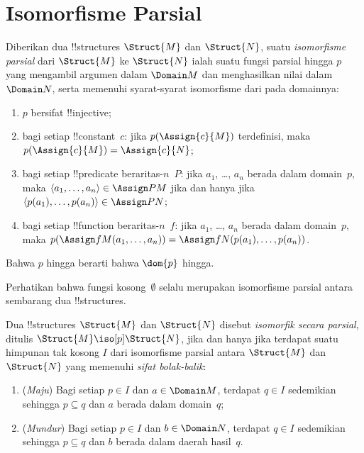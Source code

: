 \documentclass[../../../include/open-logic-section]{subfiles}
\begin{document}
\section{Isomorfisme Parsial}

\begin{defn}
  Diberikan dua !!{structure}s $\Struct{M}$ dan $\Struct{N}$, suatu
  \emph{isomorfisme parsial} dari $\Struct{M}$ ke $\Struct{N}$ ialah suatu
  fungsi parsial hingga $p$ yang mengambil argumen dalam $\Domain M$ dan
  menghasilkan nilai dalam $\Domain N$, serta memenuhi syarat-syarat
  isomorfisme dari  pada domainnya:
  \begin{enumerate}
  \item $p$ bersifat !!{injective};
  \item bagi setiap !!{constant}~$c$: jika $p(\Assign{c}{M})$
    terdefinisi, maka $p(\Assign{c}{M}) = \Assign{c}{N}$;
  \item bagi setiap !!{predicate} beraritas-$n$~$P$: jika $a_1$, \dots,
    $a_n$ berada dalam domain~$p$, maka $\langle a_1, \dots, a_n\rangle
    \in \Assign P M$ jika dan hanya jika $\langle p(a_1), \dots,
    p(a_n) \rangle \in \Assign P N$;
  \item bagi setiap !!{function} beraritas-$n$~$f$: jika $a_1$, \dots,
    $a_n$ berada dalam domain~$p$, maka $p(\Assign f M (a_1, \dots,a_n))
    = \Assign f N (p(a_1), \dots, p(a_n))$.
  \end{enumerate}
  Bahwa $p$ hingga berarti bahwa $\dom{p}$ hingga.
\end{defn}

Perhatikan bahwa fungsi kosong~$\emptyset$ selalu merupakan isomorfisme
parsial antara sembarang dua !!{structure}s.

\begin{defn}
  Dua !!{structure}s $\Struct{M}$ dan $\Struct{N}$ disebut
  \emph{isomorfik secara parsial}, ditulis $\Struct{M} \iso[p]
  \Struct{N}$, jika dan hanya jika terdapat suatu himpunan tak kosong $I$
  dari isomorfisme parsial antara $\Struct{M}$ dan $\Struct{N}$ yang
  memenuhi \emph{sifat bolak-balik}:
  \begin{enumerate}
  \item (\emph{Maju}) Bagi setiap $p \in I$ dan $a \in \Domain M$,
    terdapat $q \in I$ sedemikian sehingga $p \subseteq q$ dan $a$ berada
    dalam domain~$q$;
  \item (\emph{Mundur}) Bagi setiap $p \in I$ dan $b \in \Domain N$,
    terdapat $q \in I$ sedemikian sehingga $p \subseteq q$ dan $b$ berada
    dalam daerah hasil~$q$.
  \end{enumerate}
\end{defn}
\end{document}
